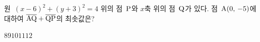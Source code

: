 \noindent\begin{minipage}[t]{0.58\linewidth}\vspace{0pt}\raggedright 원~$(x-6)^2+(y+3)^2=4$ 위의 점~$\mathrm{P}$와 $x$축 위의 점~$\mathrm{Q}$가 있다. 점~$\mathrm{A}(0,\mkern3mu -5)$에 대하여 $\overline{\mathrm{AQ}}+\overline{\mathrm{QP}}$의 최솟값은?\end{minipage}\hfill\begin{minipage}[t]{0.4\linewidth}\vspace{0pt}\centering \resizebox{\ifdim\width>\linewidth\linewidth\else\width\fi}{!}{}\end{minipage}\par
\begin{choicesii}{$8$}{$9$}{$10$}{$11$}{$12$}\end{choicesii}
